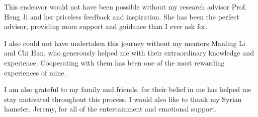 This endeavor would not have been possible without my research advisor Prof. Heng Ji and her priceless feedback and inspiration. She has been the perfect advisor, providing more support and guidance than I ever ask for. 

I also could not have undertaken this journey without my mentors Manling Li and Chi Han, who generously helped me with their extraordinary knowledge and experience. Cooperating with them has been one of the most rewarding experiences of mine.

I am also grateful to my family and friends, for their belief in me has helped me stay motivated throughout this process. I would also like to thank my Syrian hamster, Jeremy, for all of the entertainment and emotional support.